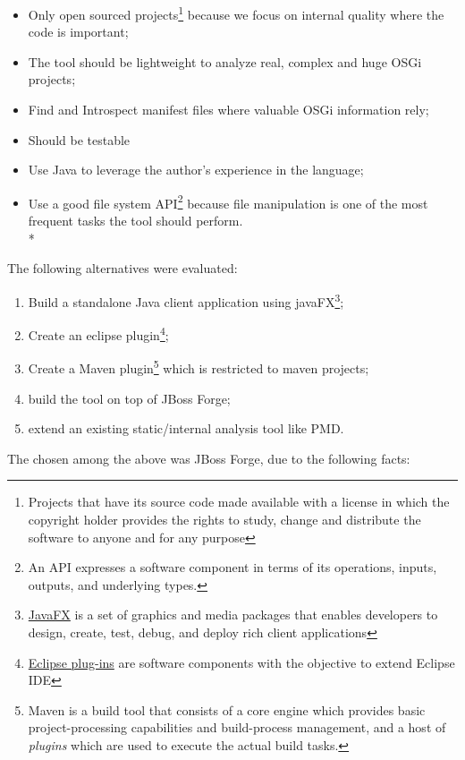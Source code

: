\begin{itemize}
\item Only open sourced projects\footnote{Projects that have its source code made available with a license in which the copyright holder provides the rights to study, change and distribute the software to anyone and for any purpose} because we focus on internal quality where the code is important;
\item The tool should be lightweight to analyze real, complex and huge OSGi projects;
\item Find and Introspect manifest files where valuable OSGi information rely; 
\item Should be testable
\item Use Java to leverage the author's experience in the language;
\item Use a good file system API\footnote{An API expresses a software component in terms of its operations, inputs, outputs, and underlying types.} because file manipulation is one of the most frequent tasks the tool should perform.\\*
\end{itemize}
 

The following alternatives were evaluated:

\begin{enumerate}
\item Build a standalone Java client application using javaFX\footnote{\href{http://docs.oracle.com/javase/8/javase-clienttechnologies.htm}{JavaFX} is a set of graphics and media packages that enables developers to design, create, test, debug, and deploy rich client applications};
\item Create an eclipse plugin\footnote{\href{https://wiki.eclipse.org/FAQ_What_is_a_plug-in\%3F}{Eclipse plug-ins} are software components with the objective to extend Eclipse IDE};
\item Create a  Maven plugin\footnote{Maven is a build tool that consists of a core engine which provides basic project-processing capabilities and build-process management, and a host of \emph{plugins} which are used to execute the actual build tasks.} which is restricted to maven projects;
\item build the tool on top of JBoss Forge;
\item extend an existing static/internal analysis tool like PMD.
\end{enumerate}

The chosen among the above was JBoss Forge, due to the following facts:

